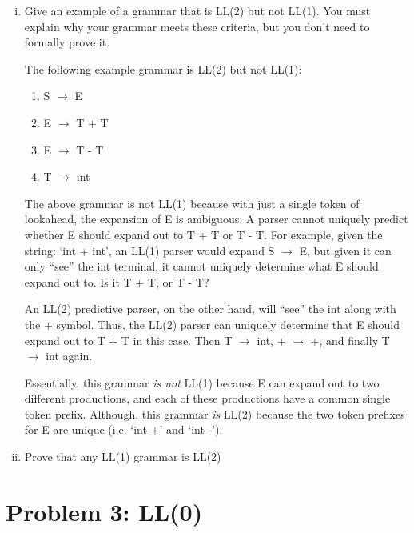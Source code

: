 \documentclass{article}
\begin{document}
\begin{enumerate}[i.]
	\item Give an example of a grammar that is LL(2) but not LL(1). You
		must explain why your grammar meets these criteria, but you don't
		need to formally prove it.

		The following example grammar is LL(2) but not LL(1):
		\begin{enumerate}[(1)]
			\item S $\to$ E
			\item E $\to$ T + T
			\item E $\to$ T - T
			\item T $\to$ int
		\end{enumerate}

		The above grammar is not LL(1) because with just a single token
		of lookahead, the expansion of E is ambiguous. A parser cannot
		uniquely predict whether E should expand out to T + T or T - T.
		For example, given the string: `int + int', an LL(1) parser
		would expand S $\to$ E, but given it can only ``see'' the int
		terminal, it cannot uniquely determine what E should expand out
		to. Is it T + T, or T - T?

		An LL(2) predictive parser, on the other hand, will ``see'' the
		int along with the + symbol. Thus, the LL(2) parser can
		uniquely determine that E should expand out to T + T in this
		case. Then T $\to$ int, + $\to$ +, and finally T $\to$ int
		again.

		Essentially, this grammar \emph{is not} LL(1) because E can
		expand out to two different productions, and each of these
		productions have a common single token prefix. Although, this
		grammar \emph{is} LL(2) because the two token prefixes for E
		are unique (i.e. `int +' and `int -').

	\item Prove that any LL(1) grammar is LL(2)

\end{enumerate}

\section{Problem 3: LL(0)}
\end{document}
